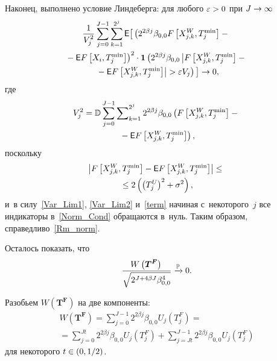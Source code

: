 \begin{multicols}{2}
Наконец, выполнено условие Линдеберга: для любого $\varepsilon\hm>0$ при $J\hm\to\infty$
\begin{multline}
\label{Norm_Cond}
\displaystyle\frac{\displaystyle 1\mathstrut}{\displaystyle V^2_j\mathstrut}\sum\limits_{j=0}^{J-1}\sum\limits_{k=1}^{2^j} {\sf E} 
\big[\left(2^{2\beta j}\beta_{0,0} F\left[X_{j,k}^W,T_j^{\min}\right]-{}\right.\\
\left.{}- {\sf E} F\left[X_i,T_j^{\min}\right]\right)^2\cdot
\mathbf{1}
\left( 2^{2\beta j}\beta_{0,0}\left\vert F\left[X_{j,k}^W,T_j^{\min}\right]-{}\right.\right.\\
\left.\left.{}-{\sf E} 
F\left[X_{j,k}^W,T_j^{\min}\right]\right\vert >\varepsilon V_j\right)\big]\rightarrow 0,
\end{multline}
где
\begin{multline*}
V^2_j=\mathbb{D}\sum\limits_{j=0}^{J-1}\sum\nolimits_{k=1}^{2^j}2^{2\beta j}
\beta_{0,0}\left(F\left[X_{j,k}^W,T_j^{\min}\right]-{}\right.\\
\left.{}-{\sf E} F\left[X_{j,k}^W,T_j^{\min}\right]\right),
\end{multline*}
поскольку
\begin{multline}
\label{term}
    \left\vert F\left[X_{j,k}^W,T_j^{\min}\right]-{\sf E} F\left[ X_{j,k}^W,T_j^{\min}\right]\right\vert \le {}\\
    {}\le 2\left(\left(T_j^U\right)^2+\sigma^2\right),
\end{multline} 
и~в силу~\eqref {Var_Lim1}, \eqref{Var_Lim2} и~\eqref{term} 
начиная с~некоторого~$j$ все индикаторы в~\eqref{Norm_Cond} обращаются в~нуль. 
Таким образом, справедливо~\eqref{Rm_norm}.

Осталось показать, что
\begin{equation}
\label{WTF}
  \displaystyle\frac{\displaystyle W\left(\bm{T^F}\right)\mathstrut}{\displaystyle \sqrt{2^{J+4\beta J} \beta_{0,0}^4}\mathstrut} \xrightarrow{\mathbb{P}} 0.
\end{equation}

Разобьем $W(\bm{T^F})$ на две компоненты:
\begin{multline}
\label{w_f}
W(\bm{T^F}) = \sum\limits_{j=0}^{J-1}2^{2\beta j} \beta_{0,0}U_j(T_{j}^F) ={}\\
{}=
\sum\limits_{j=0}^{Jt}2^{2\beta j} \beta_{0,0}U_j(T_{j}^F) + 
\sum\limits_{j=Jt}^{J-1}2^{2\beta j} \beta_{0,0}U_j\left(T_{j}^F\right)
\end{multline}
для некоторого $t\hm\in (0,1/2)$.


\end{multicols}
